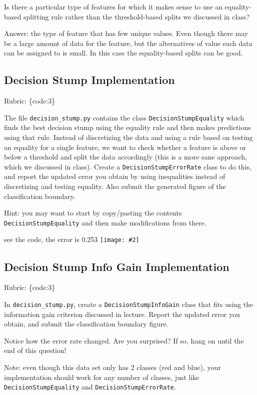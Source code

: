 \documentclass{article}
\def\rubric#1{\gre{Rubric: \{#1\}}}{}
\def\blu#1{{\color{blu}#1}}
\def\gre#1{{\color{gre}#1}}
\def\red#1{{\color{red}#1}}
\newcommand{\fig}[2]{\texttt{[image: \#2]}}
\begin{document}
Is there a particular type of features for which it makes sense to use an equality-based splitting rule rather than the threshold-based splits we discussed in class?

\red{Answer:
the type of feature that has few unique values.
Even though there may be a large amount of data for the feature, but the alternatives of value each data can be assigned to is small.
In this case the equality-based splits can be good.
}
\subsection{Decision Stump Implementation}
\rubric{code:3}

The file \texttt{decision\string_stump.py} contains the class \texttt{DecisionStumpEquality} which
finds the best decision stump using the equality rule and then makes predictions using that
rule. Instead of discretizing the data and using a rule based on testing an equality for
a single feature, we want to check whether a feature is above or below a threshold and
split the data accordingly (this is a more sane approach, which we discussed in class).
\blu{Create a \texttt{DecisionStumpErrorRate} class to do this, and report the updated error you
obtain by using inequalities instead of discretizing and testing equality. Also submit the generated figure of the classification boundary.}

Hint: you may want to start by copy/pasting the contents \texttt{DecisionStumpEquality} and then make modifications from there.

\red{
see the code, the error is 0.253
}
\fig{1}{../figs/q6_2_decisionBoundary}


\subsection{Decision Stump Info Gain Implementation}
\rubric{code:3}

In \texttt{decision\string_stump.py}, \blu{create a \texttt{DecisionStumpInfoGain} class that
fits using the information gain criterion discussed in lecture. Report the updated error you obtain, and submit the classification boundary figure.}

Notice how the error rate changed. Are you surprised? If so, hang on until the end of this question!

Note: even though this data set only has 2 classes (red and blue), your implementation should work
for any number of classes, just like \texttt{DecisionStumpEquality} and \texttt{DecisionStumpErrorRate}.
\end{document}
